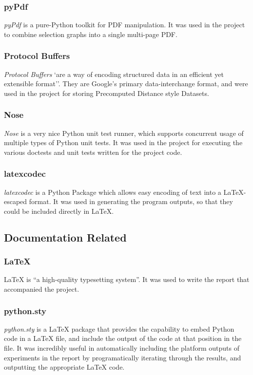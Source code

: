 \documentclass[a4paper,11pt]{report}
\begin{document}
\subsubsection*{pyPdf}
\emph{pyPdf} \citep{prog:pypdf} is a pure-Python toolkit for PDF manipulation. It was used in the project to combine selection graphs into a single multi-page PDF.

\subsubsection*{Protocol Buffers}
\emph{Protocol Buffers} \citep{prog:protocolbuffers} `are a way of encoding structured data in an efficient yet extensible format''. They are Google's primary data-interchange format, and were used in the project for storing Precomputed Distance style Datasets.

\subsubsection*{Nose}
\emph{Nose} \citep{prog:nose} is a very nice Python unit test runner, which supports concurrent usage of multiple types of Python unit tests. It was used in the project for executing the various doctests and unit tests written for the project code.

\subsubsection*{latexcodec}
\emph{latexcodec} \citep{prog:latexcodec} is a Python Package which allows easy encoding of text into a \LaTeX{}-escaped format. It was used in generating the program outputs, so that they could be included directly in \LaTeX{}.

\subsection{Documentation Related}

\subsubsection*{\LaTeX{}}
\LaTeX{} \citep{prog:latex} is ``a high-quality typesetting system''. It was used to write the report that accompanied the project.

\subsubsection*{python.sty}
\emph{python.sty} \citep{prog:pythonsty} is a \LaTeX{} package that provides the capability to embed Python code in a \LaTeX{} file, and include the output of the code at that position in the file. It was incredibly useful in automatically including the platform outputs of experiments in the report by programatically iterating through the results, and outputting the appropriate \LaTeX{} code.
\end{document}

